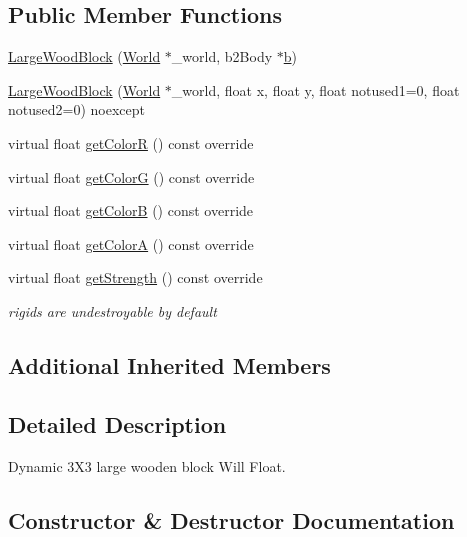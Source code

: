\subsection*{Public Member Functions}
\begin{DoxyCompactItemize}
\item 
\hyperlink{classLargeWoodBlock_a4cc89f817ec63b73772111006cd6637e}{Large\+Wood\+Block} (\hyperlink{classWorld}{World} $\ast$\+\_\+world, b2\+Body $\ast$\hyperlink{image_8h_ab2d05693952610f937e5acb3c4a8fa1b}{b})
\item 
\hyperlink{classLargeWoodBlock_a508178e3bc340539a9b0e733eefebffb}{Large\+Wood\+Block} (\hyperlink{classWorld}{World} $\ast$\+\_\+world, float x, float y, float notused1=0, float notused2=0) noexcept
\item 
virtual float \hyperlink{classLargeWoodBlock_a3eeebdbf61b9f33a02b5c845f31ba428}{get\+Color\+R} () const override
\item 
virtual float \hyperlink{classLargeWoodBlock_ae422ccf33effdf80ee4bf7688de05b92}{get\+Color\+G} () const override
\item 
virtual float \hyperlink{classLargeWoodBlock_ac2499af4b661efeeee7662dff8af48f2}{get\+Color\+B} () const override
\item 
virtual float \hyperlink{classLargeWoodBlock_a74390f6c417c547b18db713696d2a12d}{get\+Color\+A} () const override
\item 
virtual float \hyperlink{classLargeWoodBlock_a445e21e6e8a723237616d3f7e0b6e1e0}{get\+Strength} () const override
\begin{DoxyCompactList}\small\item\em rigids are undestroyable by default \end{DoxyCompactList}\end{DoxyCompactItemize}
\subsection*{Additional Inherited Members}


\subsection{Detailed Description}
Dynamic 3\+X3 large wooden block Will Float. 

\subsection{Constructor \& Destructor Documentation}
\hypertarget{classLargeWoodBlock_a4cc89f817ec63b73772111006cd6637e}{}
